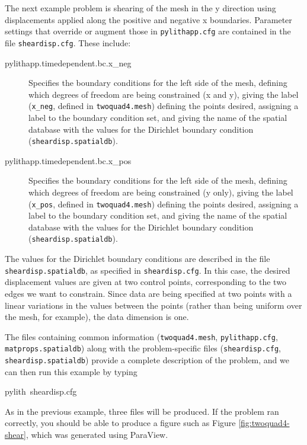 The next example problem is shearing of the mesh in the y direction
using displacements applied along the positive and negative x boundaries.
Parameter settings that override or augment those in \texttt{pylithapp.cfg}
are contained in the file \texttt{sheardisp.cfg}. These include:
\begin{description}
\item [{pylithapp.timedependent.bc.x\_neg}] Specifies the boundary conditions
for the left side of the mesh, defining which degrees of freedom are
being constrained (x and y), giving the label (\texttt{x\_neg}, defined
in \texttt{twoquad4.mesh}) defining the points desired, assigning
a label to the boundary condition set, and giving the name of the
spatial database with the values for the Dirichlet boundary condition
(\texttt{sheardisp.spatialdb}).
\item [{pylithapp.timedependent.bc.x\_pos}] Specifies the boundary conditions
for the left side of the mesh, defining which degrees of freedom are
being constrained (y only), giving the label (\texttt{x\_pos}, defined
in \texttt{twoquad4.mesh}) defining the points desired, assigning
a label to the boundary condition set, and giving the name of the
spatial database with the values for the Dirichlet boundary condition
(\texttt{sheardisp.spatialdb}).
\end{description}
The values for the Dirichlet boundary conditions are described in
the file \texttt{sheardisp.spatialdb}, as specified in \texttt{sheardisp.cfg}.
In this case, the desired displacement values are given at two control
points, corresponding to the two edges we want to constrain. Since
data are being specified at two points with a linear variations in
the values between the points (rather than being uniform over the
mesh, for example), the data dimension is one.

The files containing common information (\texttt{twoquad4.mesh}, \texttt{pylithapp.cfg},
\texttt{matprops.spatialdb}) along with the problem-specific files
(\texttt{sheardisp.cfg}, \texttt{sheardisp.spatialdb}) provide a complete
description of the problem, and we can then run this example by typing
\begin{lyxcode}
pylith~sheardisp.cfg
\end{lyxcode}
As in the previous example, three files will be produced. If the problem
ran correctly, you should be able to produce a figure such as Figure
\vref{fig:twoquad4-shear}, which was generated using ParaView.

